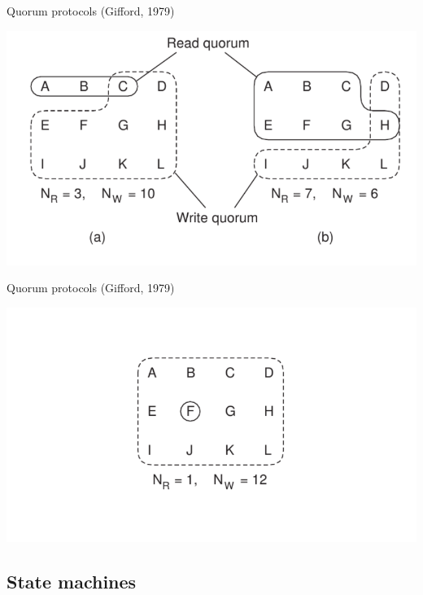 \begin{frame}{Quorum protocols (Gifford, 1979)}

\includegraphics[width=\textwidth]{quorum1}

\end{frame}

\begin{frame}{Quorum protocols (Gifford, 1979)}

\includegraphics[width=\textwidth]{quorum2}

\end{frame}

\subsection{State machines}

